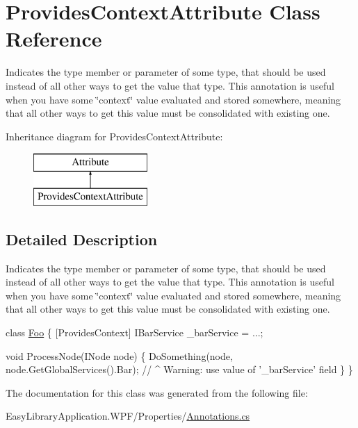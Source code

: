 \hypertarget{class_provides_context_attribute}{}\section{Provides\+Context\+Attribute Class Reference}
\label{class_provides_context_attribute}


Indicates the type member or parameter of some type, that should be used instead of all other ways to get the value that type. This annotation is useful when you have some \char`\"{}context\char`\"{} value evaluated and stored somewhere, meaning that all other ways to get this value must be consolidated with existing one.  


Inheritance diagram for Provides\+Context\+Attribute\+:\begin{figure}[H]
\begin{center}
\leavevmode
\includegraphics[height=2.000000cm]{class_provides_context_attribute}
\end{center}
\end{figure}


\subsection{Detailed Description}
Indicates the type member or parameter of some type, that should be used instead of all other ways to get the value that type. This annotation is useful when you have some \char`\"{}context\char`\"{} value evaluated and stored somewhere, meaning that all other ways to get this value must be consolidated with existing one. 


\begin{DoxyCode}
\textcolor{keyword}{class }\mbox{\hyperlink{_annotations_8cs_a710c2378b43f44cd4a9b365c85be5d6c}{Foo}} \{
  [ProvidesContext] IBarService \_barService = ...;

  \textcolor{keywordtype}{void} ProcessNode(INode node) \{
    DoSomething(node, node.GetGlobalServices().Bar);
    \textcolor{comment}{//              ^ Warning: use value of '\_barService' field}
  \}
\}
\end{DoxyCode}


The documentation for this class was generated from the following file\+:\begin{DoxyCompactItemize}
\item 
Easy\+Library\+Application.\+W\+P\+F/\+Properties/\mbox{\hyperlink{_annotations_8cs}{Annotations.\+cs}}\end{DoxyCompactItemize}
